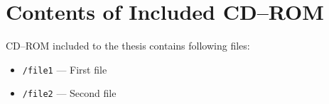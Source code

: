 \chapter{Contents of Included CD–ROM \label{cha:cdrom} }

CD–ROM included to the thesis contains following files:

\begin{itemize}
\item \texttt{/file1} --- First file
\item \texttt{/file2} --- Second file
\end{itemize}
